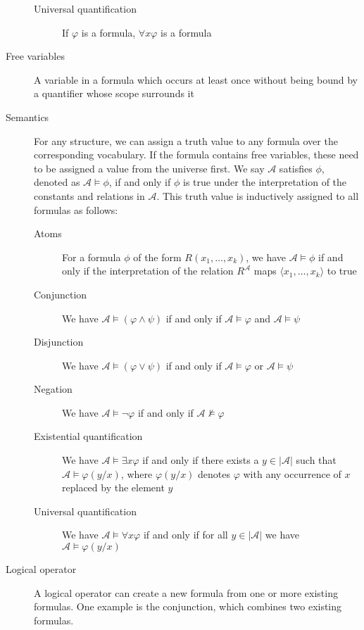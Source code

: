 \begin{description}
\begin{description}
        \item[Universal quantification] If $\varphi$ is a formula, $\forall x \varphi$ is a formula
    \end{description}
    \item[Free variables] A variable in a formula which occurs at least once without being bound by a quantifier whose scope surrounds it
    \item[Semantics] For any structure, we can assign a truth value to any formula over the corresponding vocabulary.
    If the formula contains free variables, these need to be assigned a value from the universe first.
    We say $\mathcal{A}$ satisfies $\phi$, denoted as $\mathcal{A} \models \phi$, if and only if $\phi$ is true under the interpretation of the constants and relations in $\mathcal{A}$.
    This truth value is inductively assigned to all formulas as follows:
    \begin{description}
        \item[Atoms] For a formula $\phi$ of the form $R(x_1, \dots, x_k)$, we have $\mathcal{A} \models \phi$ if and only if the interpretation of the relation $R^{\mathcal{A}}$ maps $\langle x_1, \dots, x_k \rangle$ to true
        \item[Conjunction] We have $\mathcal{A} \models (\varphi \land \psi)$ if and only if $\mathcal{A} \models \varphi$ and $\mathcal{A} \models \psi$
        \item[Disjunction]  We have $\mathcal{A} \models (\varphi \lor \psi)$ if and only if $\mathcal{A} \models \varphi$ or $\mathcal{A} \models \psi$
        \item[Negation] We have $\mathcal{A} \models \lnot \varphi$ if and only if $\mathcal{A} \not\models \varphi$
        \item[Existential quantification] We have $\mathcal{A} \models \exists x\varphi$ if and only if there exists a $y \in |\mathcal{A}|$ such that $\mathcal{A} \models \varphi(y / x)$, where $\varphi(y / x)$ denotes $\varphi$ with any occurrence of $x$ replaced by the element $y$
        \item[Universal quantification] We have $\mathcal{A} \models \forall x\varphi$ if and only if for all $y \in |\mathcal{A}|$ we have $\mathcal{A} \models \varphi(y / x)$
    \end{description}
    \item[Logical operator] A logical operator can create a new formula from one or more existing formulas.
    One example is the conjunction, which combines two existing formulas.

\end{description}
